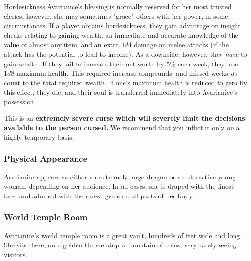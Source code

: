\begin{adventureidea}{Hordesickness}
Avarianice's blessing is normally reserved for her most trusted clerics, however, she may sometimes "grace" others with her power, in some circumstances.
If a player obtains hordesickness, they gain advantage on insight checks relating to gaining wealth, an immediate and accurate knowledge of the value of almost any item, and an extra $ 1d4 $ damage on melee attacks (if the attack has the potential to lead to income).
As a downside, however, they \textit{have} to gain wealth.
If they fail to increase their net worth by 5\% each weak, they lose $1d8$ maximum health.
This required increase compounds, and missed weeks \textit{do} count to the total required wealth.
If one's maximum health is reduced to zero by this effect, they die, and their soul is transferred immediately into Avarianice's possession.

This is an \textbf{extremely severe curse which will severely limit the decisions available to the person cursed.}
We recommend that you inflict it only on a highly temporary basis.
\end{adventureidea}

\subsubsection*{Physical Appearance}
Avarianice appears as either an extremely large dragon or an attractive young woman, depending on her audience.
In all cases, she is draped with the finest lace, and adorned with the rarest gems on all parts of her body.

\subsubsection*{World Temple Room}
Avarianice's world temple room is a great vault, hundreds of feet wide and long.
She sits there, on a golden throne atop a mountain of coins, very rarely seeing visitors.
